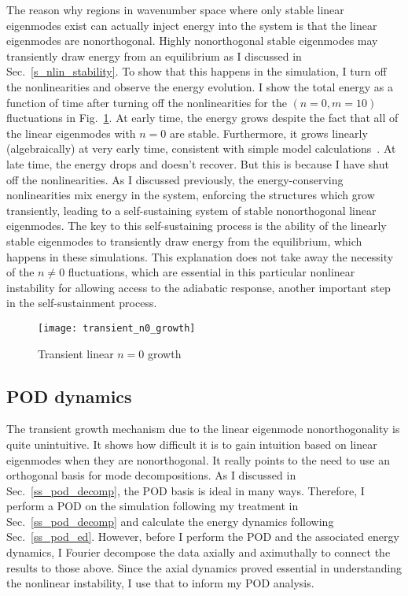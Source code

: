 The reason why regions in wavenumber space where only stable linear eigenmodes exist can actually inject energy into the system is that the 
linear eigenmodes are nonorthogonal. Highly nonorthogonal stable eigenmodes may transiently draw energy from an equilibrium as I discussed in Sec.~\ref{s_nlin_stability}.
To show that this happens in the simulation, I turn off the nonlinearities and observe the energy evolution. I show the total energy as a function of time after turning off the nonlinearities
for the $(n=0,m=10)$ fluctuations in Fig.~\ref{transient_n0_growth}. At early time, the energy grows despite the fact that all of the linear eigenmodes with $n=0$ are stable. Furthermore,
it grows linearly (algebraically) at very early time, consistent with simple model calculations~\cite{waleffe1995}. 
At late time, the energy drops and doesn't recover. But this is because I have shut off the nonlinearities. As I discussed previously, 
the energy-conserving nonlinearities mix energy in the system, enforcing the structures which grow transiently, leading to a self-sustaining system of stable nonorthogonal linear eigenmodes.
The key to this self-sustaining process is the ability of the linearly stable eigenmodes to transiently draw energy from the equilibrium, which happens in these simulations.
This explanation does not take away the necessity of the $n \ne 0$ fluctuations, which are essential in this particular nonlinear instability for allowing access to the adiabatic response,
another important step in the self-sustainment process.

\begin{figure}[!ht]
\centerline{\texttt{[image: transient\_n0\_growth]}}
\caption{Transient linear $n=0$ growth}
\label{transient_n0_growth}
\end{figure}

\subsection{POD dynamics}
\label{ss_pod_dynamics}

The transient growth mechanism due to the linear eigenmode nonorthogonality is quite unintuitive. It shows how difficult it is to gain intuition based on linear eigenmodes when they are
nonorthogonal. It really points to the need to use an orthogonal basis for mode decompositions. As I discussed in Sec.~\ref{ss_pod_decomp}, the POD basis is ideal in many ways. Therefore, I
perform a POD on the simulation following my treatment in Sec.~\ref{ss_pod_decomp} and calculate the energy dynamics following Sec.~\ref{ss_pod_ed}. However, before I perform the POD
and the associated energy dynamics, I Fourier decompose the data axially and aximuthally to connect the results to those above. Since the axial dynamics proved essential in understanding
the nonlinear instability, I use that to inform my POD analysis.

